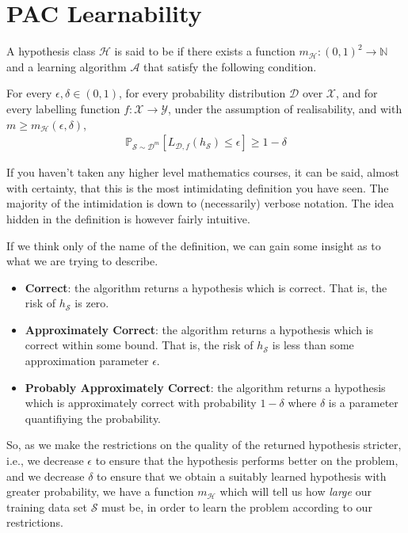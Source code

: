 \section{PAC Learnability \challenging}
\begin{definition}
	A hypothesis class $ \mathcal{H} $ is said to be  if there exists a function $ m_{\mathcal{H}}: ( 0,1 )^{2}\to \mathbb{N} $ and a learning algorithm $ \mathcal{A} $ that satisfy the following condition.

	For every $ \epsilon, \delta \in ( 0,1 ) $, for every probability distribution $ \mathcal{D} $ over $ \mathcal{X} $, and for every labelling function $ f: \mathcal{X}\to \mathcal{Y} $, under the assumption of realisability, and with $ m \geq m_{\mathcal{H}}( \epsilon, \delta ) $,
	\begin{align*}
		\mathbb{P}_{\mathcal{S}\sim \mathcal{D}^{m}}\left[ L_{\mathcal{D}, f}( h_{\mathcal{S}} )\leq \epsilon \right] \geq 1-\delta
	\end{align*}
\end{definition}

\begin{remark}
	If you haven't taken any higher level mathematics courses, it can be said, almost with certainty, that this is the most intimidating definition you have seen. The majority of the intimidation is down to (necessarily) verbose notation. The idea hidden in the definition is however fairly intuitive.

	If we think only of the name of the definition, we can gain some insight as to what we are trying to describe.
	\begin{itemize}
		\item \textbf{Correct}: the algorithm returns a hypothesis which is correct. That is, the risk of $ h_{\mathcal{S}} $ is zero.
		\item \textbf{Approximately Correct}: the algorithm returns a hypothesis which is correct within some bound. That is, the risk of $ h_{\mathcal{S}} $ is less than some approximation parameter $ \epsilon $.
		\item \textbf{Probably Approximately Correct}: the algorithm returns a hypothesis which is approximately correct with probability $ 1-\delta $ where $ \delta $ is a parameter quantifiying the probability.
	\end{itemize}

	So, as we make the restrictions on the quality of the returned hypothesis stricter, i.e., we decrease $ \epsilon $ to ensure that the hypothesis performs better on the problem, and we decrease $ \delta $ to ensure that we obtain a suitably learned hypothesis with greater probability, we have a function $ m_{\mathcal{H}} $ which will tell us how \textit{large} our training data set $ \mathcal{S} $ must be, in order to learn the problem according to our restrictions.
\end{remark}

